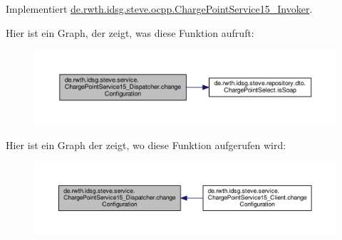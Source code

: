 Implementiert \hyperlink{interfacede_1_1rwth_1_1idsg_1_1steve_1_1ocpp_1_1_charge_point_service15___invoker_acdb5b5a3e719113e9a14b04d534acc81}{de.\-rwth.\-idsg.\-steve.\-ocpp.\-Charge\-Point\-Service15\-\_\-\-Invoker}.



Hier ist ein Graph, der zeigt, was diese Funktion aufruft\-:\nopagebreak
\begin{figure}[H]
\begin{center}
\leavevmode
\includegraphics[width=350pt]{classde_1_1rwth_1_1idsg_1_1steve_1_1service_1_1_charge_point_service15___dispatcher_a143b2a7621bfe7b82f6916e1aa1d5430_cgraph}
\end{center}
\end{figure}




Hier ist ein Graph der zeigt, wo diese Funktion aufgerufen wird\-:\nopagebreak
\begin{figure}[H]
\begin{center}
\leavevmode
\includegraphics[width=350pt]{classde_1_1rwth_1_1idsg_1_1steve_1_1service_1_1_charge_point_service15___dispatcher_a143b2a7621bfe7b82f6916e1aa1d5430_icgraph}
\end{center}
\end{figure}


